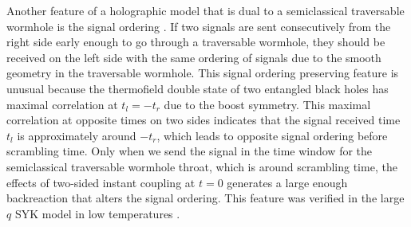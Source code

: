 \documentclass[11pt]{article}
\renewcommand{\>}{\rangle}
\newcommand{\<}{\langle}
\begin{document}
Another feature of a holographic model that is dual to a semiclassical
traversable wormhole is the signal ordering \cite{Gao:2019nyj}. If two signals
are sent consecutively from the right side early enough to go through
a traversable wormhole, they should be received on the left side with
the same ordering of signals due to the smooth geometry in the traversable
wormhole. This signal ordering preserving feature is unusual because
the thermofield double state of two entangled black holes has maximal
correlation at $t_{l}=-t_{r}$ due to the boost symmetry. This maximal
correlation at opposite times on two sides indicates that the signal
received time $t_{l}$ is approximately around $-t_{r}$, which leads
to opposite signal ordering before scrambling time. Only when we send
the signal in the time window for the semiclassical traversable wormhole
throat, which is around scrambling time, the effects of two-sided
instant coupling at $t=0$ generates a large enough backreaction that
alters the signal ordering. This feature was verified in the large
$q$ SYK model in low temperatures \cite{Gao:2019nyj}. 
\end{document}
